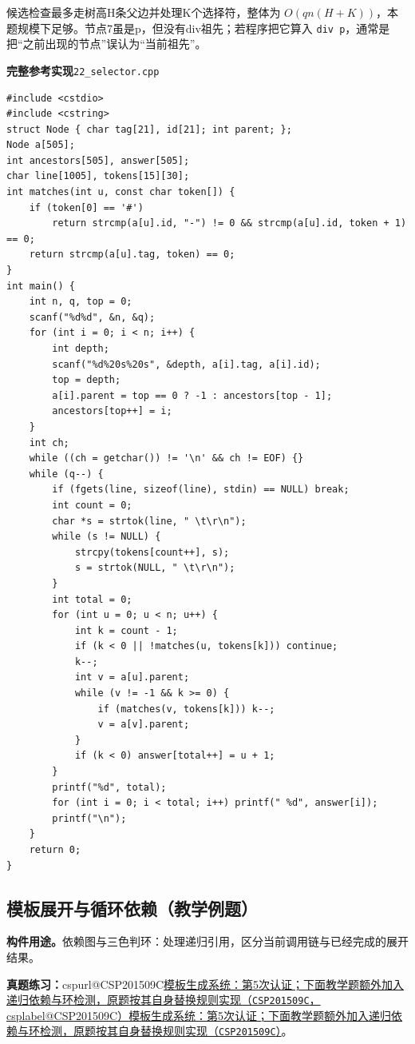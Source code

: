 \documentclass[UTF8,11pt,a4paper,fontset=none]{ctexart}
\makeatletter
\newcommand{\csp}[2]{\ifcsname cspurl@#1\endcsname\href{\csname cspurl@#1\endcsname}{#2（\texttt{#1}，\csname csplabel@#1\endcsname）}\else\href{https://oj.shumeng.tech/p/#1}{#2（\texttt{#1}）}\fi}
\newcommand{\ojpractice}[2]{\par\noindent\textbf{真题练习：}\csp{#1}{#2}。\par}
\makeatother
\begin{document}
候选检查最多走树高H条父边并处理K个选择符，整体为 $O(qn(H+K))$，本题规模下足够。节点7虽是p，但没有div祖先；若程序把它算入 \texttt{div p}，通常是把“之前出现的节点”误认为“当前祖先”。
\par\noindent\begin{minipage}{\linewidth}
\textbf{完整参考实现}\quad\texttt{22\_selector.cpp}
\begin{lstlisting}
#include <cstdio>
#include <cstring>
struct Node { char tag[21], id[21]; int parent; };
Node a[505];
int ancestors[505], answer[505];
char line[1005], tokens[15][30];
int matches(int u, const char token[]) {
    if (token[0] == '#')
        return strcmp(a[u].id, "-") != 0 && strcmp(a[u].id, token + 1) == 0;
    return strcmp(a[u].tag, token) == 0;
}
int main() {
    int n, q, top = 0;
    scanf("%d%d", &n, &q);
    for (int i = 0; i < n; i++) {
        int depth;
        scanf("%d%20s%20s", &depth, a[i].tag, a[i].id);
        top = depth;
        a[i].parent = top == 0 ? -1 : ancestors[top - 1];
        ancestors[top++] = i;
    }
    int ch;
    while ((ch = getchar()) != '\n' && ch != EOF) {}
    while (q--) {
        if (fgets(line, sizeof(line), stdin) == NULL) break;
        int count = 0;
        char *s = strtok(line, " \t\r\n");
        while (s != NULL) {
            strcpy(tokens[count++], s);
            s = strtok(NULL, " \t\r\n");
        }
        int total = 0;
        for (int u = 0; u < n; u++) {
            int k = count - 1;
            if (k < 0 || !matches(u, tokens[k])) continue;
            k--;
            int v = a[u].parent;
            while (v != -1 && k >= 0) {
                if (matches(v, tokens[k])) k--;
                v = a[v].parent;
            }
            if (k < 0) answer[total++] = u + 1;
        }
        printf("%d", total);
        for (int i = 0; i < total; i++) printf(" %d", answer[i]);
        printf("\n");
    }
    return 0;
}
\end{lstlisting}
\end{minipage}\par


\subsection{模板展开与循环依赖（教学例题）}
\noindent\textbf{构件用途。}依赖图与三色判环：处理递归引用，区分当前调用链与已经完成的展开结果。

\ojpractice{CSP201509C}{模板生成系统：第5次认证；下面教学题额外加入递归依赖与环检测，原题按其自身替换规则实现}
\end{document}
